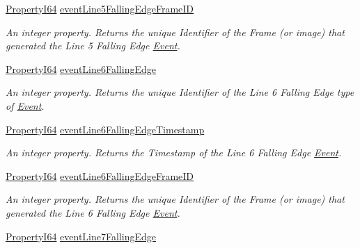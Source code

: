 \begin{DoxyCompactItemize}
\hyperlink{group___common_interface_ga81749b2696755513663492664a18a893}{Property\+I64} \hyperlink{classmv_i_m_p_a_c_t_1_1acquire_1_1_gen_i_cam_1_1_event_control_ae6b9ade841d87a46d7c9258a2e4258b3}{event\+Line5\+Falling\+Edge\+Frame\+I\+D}
\begin{DoxyCompactList}\small\item\em An integer property. Returns the unique Identifier of the Frame (or image) that generated the Line 5 Falling Edge \hyperlink{classmv_i_m_p_a_c_t_1_1acquire_1_1_event}{Event}. \end{DoxyCompactList}\item 
\hyperlink{group___common_interface_ga81749b2696755513663492664a18a893}{Property\+I64} \hyperlink{classmv_i_m_p_a_c_t_1_1acquire_1_1_gen_i_cam_1_1_event_control_ac360617db478d7c03880786d026e3bcd}{event\+Line6\+Falling\+Edge}
\begin{DoxyCompactList}\small\item\em An integer property. Returns the unique Identifier of the Line 6 Falling Edge type of \hyperlink{classmv_i_m_p_a_c_t_1_1acquire_1_1_event}{Event}. \end{DoxyCompactList}\item 
\hyperlink{group___common_interface_ga81749b2696755513663492664a18a893}{Property\+I64} \hyperlink{classmv_i_m_p_a_c_t_1_1acquire_1_1_gen_i_cam_1_1_event_control_a1801adf79e6c1422d940ad0235e13ad2}{event\+Line6\+Falling\+Edge\+Timestamp}
\begin{DoxyCompactList}\small\item\em An integer property. Returns the Timestamp of the Line 6 Falling Edge \hyperlink{classmv_i_m_p_a_c_t_1_1acquire_1_1_event}{Event}. \end{DoxyCompactList}\item 
\hyperlink{group___common_interface_ga81749b2696755513663492664a18a893}{Property\+I64} \hyperlink{classmv_i_m_p_a_c_t_1_1acquire_1_1_gen_i_cam_1_1_event_control_a89287d21eea126d6c76a71d1d1589f6d}{event\+Line6\+Falling\+Edge\+Frame\+I\+D}
\begin{DoxyCompactList}\small\item\em An integer property. Returns the unique Identifier of the Frame (or image) that generated the Line 6 Falling Edge \hyperlink{classmv_i_m_p_a_c_t_1_1acquire_1_1_event}{Event}. \end{DoxyCompactList}\item 
\hyperlink{group___common_interface_ga81749b2696755513663492664a18a893}{Property\+I64} \hyperlink{classmv_i_m_p_a_c_t_1_1acquire_1_1_gen_i_cam_1_1_event_control_a3bbff631927ffcf9f32cb0161540f31b}{event\+Line7\+Falling\+Edge}

\end{DoxyCompactItemize}

